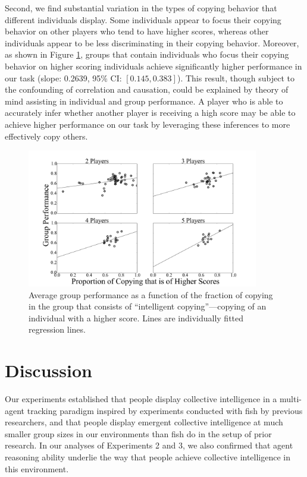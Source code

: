\documentclass[12pt,letterpaper]{article}
\begin{document}
Second, we find substantial variation in the types of copying behavior
that different individuals display.  Some individuals appear to focus
their copying behavior on other players who tend to have higher
scores, whereas other individuals appear to be less discriminating in
their copying behavior.  Moreover, as shown in Figure
\ref{fig:proportion}, groups that contain individuals who focus their
copying behavior on higher scoring individuals achieve significantly
higher performance in our task (slope: 0.2639, 95\% CI: $[0.145,
  0.383]$).  This result, though subject to the confounding of
correlation and causation, could be explained by theory of mind
assisting in individual and group performance.  A player who is able
to accurately infer whether another player is receiving a high score
may be able to achieve higher performance on our task by leveraging
these inferences to more effectively copy others.

\begin{figure}
  \centering
  \includegraphics[width=0.9\textwidth]{./figures/copy-true-proportion}
  \caption{Average group performance as a function of the fraction of
    copying in the group that consists of ``intelligent
    copying''---copying of an individual with a higher score.  Lines
    are individually fitted regression lines.}
  \label{fig:proportion}
\end{figure}

\section{Discussion}

Our experiments established that people display collective intelligence in a multi-agent tracking paradigm inspired by experiments conducted with fish by previous researchers, and that people display emergent collective intelligence at much smaller group sizes in our environments than fish do in the setup of prior research.  In our analyses of Experiments 2 and 3, we also confirmed that agent reasoning ability underlie the way that people achieve collective intelligence in this environment.
\end{document}
